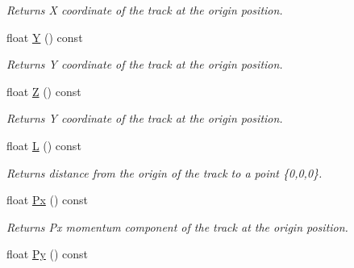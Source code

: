 \begin{DoxyCompactItemize}
\begin{DoxyCompactList}\small\item\em Returns X coordinate of the track at the origin position. \end{DoxyCompactList}\item 
float \hyperlink{classKFMCTrack_aecd7bdeb558cbfdf06af5cb61e83c59d}{Y} () const \hypertarget{classKFMCTrack_aecd7bdeb558cbfdf06af5cb61e83c59d}{}\label{classKFMCTrack_aecd7bdeb558cbfdf06af5cb61e83c59d}

\begin{DoxyCompactList}\small\item\em Returns Y coordinate of the track at the origin position. \end{DoxyCompactList}\item 
float \hyperlink{classKFMCTrack_a12b43839eb12800b20a1e471c919abdc}{Z} () const \hypertarget{classKFMCTrack_a12b43839eb12800b20a1e471c919abdc}{}\label{classKFMCTrack_a12b43839eb12800b20a1e471c919abdc}

\begin{DoxyCompactList}\small\item\em Returns Y coordinate of the track at the origin position. \end{DoxyCompactList}\item 
float \hyperlink{classKFMCTrack_a41124c1a17d96c313dc359900ddad4d6}{L} () const \hypertarget{classKFMCTrack_a41124c1a17d96c313dc359900ddad4d6}{}\label{classKFMCTrack_a41124c1a17d96c313dc359900ddad4d6}

\begin{DoxyCompactList}\small\item\em Returns distance from the origin of the track to a point \{0,0,0\}. \end{DoxyCompactList}\item 
float \hyperlink{classKFMCTrack_a0d02638aa1cc226394734843767d133b}{Px} () const \hypertarget{classKFMCTrack_a0d02638aa1cc226394734843767d133b}{}\label{classKFMCTrack_a0d02638aa1cc226394734843767d133b}

\begin{DoxyCompactList}\small\item\em Returns Px momentum component of the track at the origin position. \end{DoxyCompactList}\item 
float \hyperlink{classKFMCTrack_aae9cf1f3bcb19684e181a2ce91907c22}{Py} () const \hypertarget{classKFMCTrack_aae9cf1f3bcb19684e181a2ce91907c22}{}\label{classKFMCTrack_aae9cf1f3bcb19684e181a2ce91907c22}


\end{DoxyCompactItemize}
